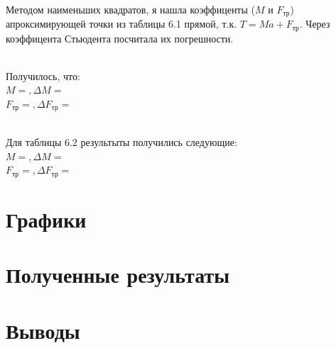 \documentclass[20pt]{article}
\begin{document}
\\ Методом наименьших квадратов, я нашла коэффиценты ($M$ и $F_{тр}$) апроксимирующей точки из таблицы 6.1 прямой, т.к. $T = M a + F_{тр}$. Через коэффицента Стьюдента посчитала их погрешности.

\\ Получилось, что:
\\ $M = , \Delta M =$
\\ $F_{тр} = , \Delta F_{тр} =$

\\Для таблицы 6.2 результыты получились следующие:
\\ $M = , \Delta M =$
\\ $F_{тр} = , \Delta F_{тр} =$
\section{Графики}
\section{Полученные результаты}
\section{Выводы}
\end{document}
